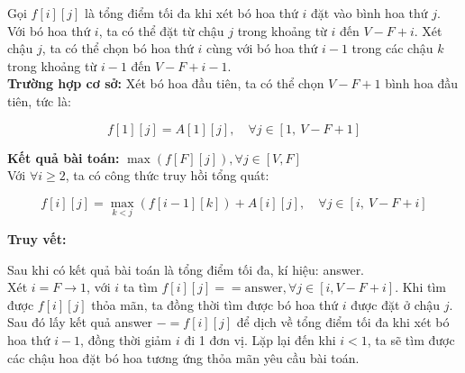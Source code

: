 Gọi $f[i][j]$ là tổng điểm tối đa khi xét bó hoa thứ $i$ đặt vào bình hoa thứ $j$.\\

Với bó hoa thứ $i$, ta có thể đặt từ chậu $j$ trong khoảng từ  $i$ đến $V - F + i$. Xét chậu $j$, ta có thể chọn bó hoa thứ $i$ cùng với bó hoa thứ $i - 1$ trong các chậu $k$ trong khoảng từ $i - 1$ đến $V - F + i - 1$.\\

\textbf{Trường hợp cơ sở:} Xét bó hoa đầu tiên, ta có thể chọn $V - F + 1$ bình hoa đầu tiên, tức là:

\[
f[1][j] = A[1][j], \quad \forall j \in [1,\ V - F + 1]
\]

\textbf{Kết quả bài toán:} $\max \left( f[F][j] \right), \forall j \in [V, F]$\\

Với $\forall i \geq 2$, ta có công thức truy hồi tổng quát:

\[
f[i][j] = \max_{k < j} \left( f[i-1][k] \right) + A[i][j], \quad \forall j \in [i,\ V - F + i]
\]

\textbf{Truy vết:}

Sau khi có kết quả bài toán là tổng điểm tối đa, kí hiệu: answer.\\

Xét $i = F \rightarrow 1$, với $i$ ta tìm $f[i][j] == \text{answer}, \forall j \in [i, V - F + i]$. Khi tìm được $f[i][j]$ thỏa mãn, ta đồng thời tìm được bó hoa thứ $i$ được đặt ở chậu $j$. Sau đó lấy kết quả answer $-= f[i][j]$ để dịch về tổng điểm tối đa khi xét bó hoa thứ $i - 1$, đồng thời giảm $i$ đi 1 đơn vị. Lặp lại đến khi $i < 1$, ta sẽ tìm được các chậu hoa đặt bó hoa tương ứng thỏa mãn yêu cầu bài toán.\\


